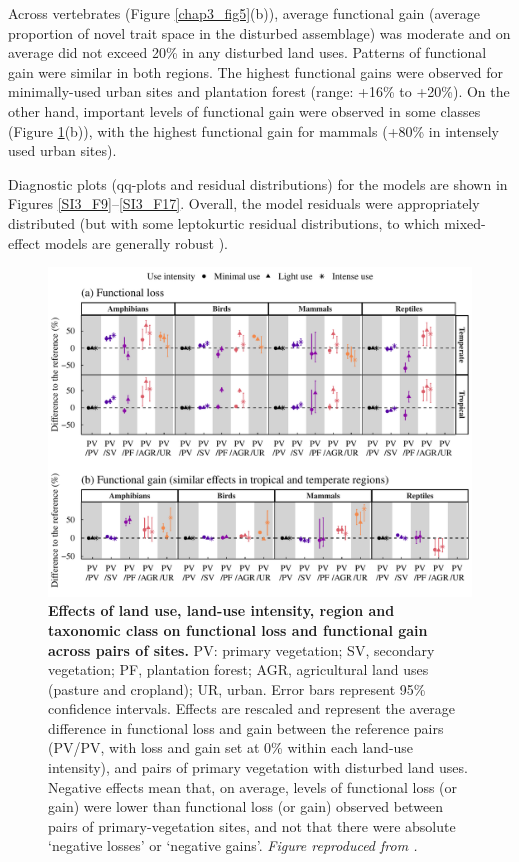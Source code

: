 Across vertebrates (Figure \ref{chap3_fig5}(b)), average functional gain (average proportion of novel trait space in the disturbed assemblage) was moderate and on average did not exceed 20\% in any disturbed land uses. Patterns of functional gain were similar in both regions. The highest functional gains were observed for minimally-used urban sites and plantation forest (range: +16\% to +20\%). On the other hand, important levels of functional gain were observed in some classes (Figure \ref{chap3_fig6}(b)), with the highest functional gain for mammals (+80\% in intensely used urban sites).

Diagnostic plots (qq-plots and residual distributions) for the models are shown in Figures \ref{SI3_F9}–\ref{SI3_F17}. Overall, the model residuals were appropriately distributed (but with some leptokurtic residual distributions, to which mixed-effect models are generally robust \citep{Schielzeth2020}).

\begin{figure}[h!]
\centering
\includegraphics[scale=0.75]{figures/Chapter_FD/Figure6}
\caption[Effects of land use, land-use intensity, region and taxonomic class on functional loss and functional gain across pairs of sites.]{\textbf{Effects of land use, land-use intensity, region and taxonomic class on functional loss and functional gain across pairs of sites.}  PV: primary vegetation; SV, secondary vegetation; PF, plantation forest; AGR, agricultural land uses (pasture and cropland); UR, urban. Error bars represent 95\% confidence intervals. Effects are rescaled and represent the average difference in functional loss and gain between the reference pairs (PV/PV, with loss and gain set at 0\% within each land-use intensity), and pairs of primary vegetation with disturbed land uses. Negative effects mean that, on average, levels of functional loss (or gain) were lower than functional loss (or gain) observed between pairs of primary-vegetation sites, and not that there were absolute `negative losses' or `negative gains'. \textit{Figure reproduced from \citet{Etard2021}.}}
\label{chap3_fig6}
\end{figure}

